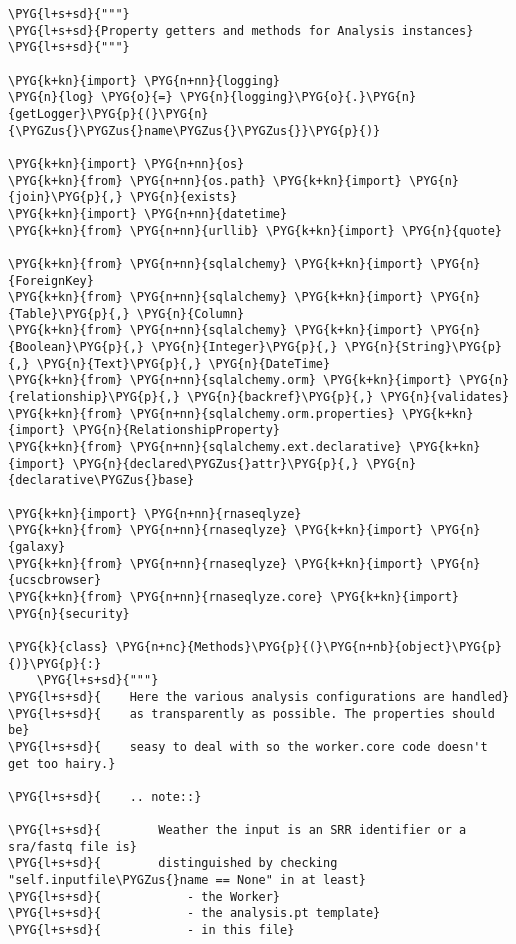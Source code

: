 \begin{Verbatim}[commandchars=\\\{\}]
\PYG{l+s+sd}{"""}
\PYG{l+s+sd}{Property getters and methods for Analysis instances}
\PYG{l+s+sd}{"""}

\PYG{k+kn}{import} \PYG{n+nn}{logging}
\PYG{n}{log} \PYG{o}{=} \PYG{n}{logging}\PYG{o}{.}\PYG{n}{getLogger}\PYG{p}{(}\PYG{n}{\PYGZus{}\PYGZus{}name\PYGZus{}\PYGZus{}}\PYG{p}{)}

\PYG{k+kn}{import} \PYG{n+nn}{os}
\PYG{k+kn}{from} \PYG{n+nn}{os.path} \PYG{k+kn}{import} \PYG{n}{join}\PYG{p}{,} \PYG{n}{exists}
\PYG{k+kn}{import} \PYG{n+nn}{datetime}
\PYG{k+kn}{from} \PYG{n+nn}{urllib} \PYG{k+kn}{import} \PYG{n}{quote}

\PYG{k+kn}{from} \PYG{n+nn}{sqlalchemy} \PYG{k+kn}{import} \PYG{n}{ForeignKey}
\PYG{k+kn}{from} \PYG{n+nn}{sqlalchemy} \PYG{k+kn}{import} \PYG{n}{Table}\PYG{p}{,} \PYG{n}{Column}
\PYG{k+kn}{from} \PYG{n+nn}{sqlalchemy} \PYG{k+kn}{import} \PYG{n}{Boolean}\PYG{p}{,} \PYG{n}{Integer}\PYG{p}{,} \PYG{n}{String}\PYG{p}{,} \PYG{n}{Text}\PYG{p}{,} \PYG{n}{DateTime}
\PYG{k+kn}{from} \PYG{n+nn}{sqlalchemy.orm} \PYG{k+kn}{import} \PYG{n}{relationship}\PYG{p}{,} \PYG{n}{backref}\PYG{p}{,} \PYG{n}{validates}
\PYG{k+kn}{from} \PYG{n+nn}{sqlalchemy.orm.properties} \PYG{k+kn}{import} \PYG{n}{RelationshipProperty}
\PYG{k+kn}{from} \PYG{n+nn}{sqlalchemy.ext.declarative} \PYG{k+kn}{import} \PYG{n}{declared\PYGZus{}attr}\PYG{p}{,} \PYG{n}{declarative\PYGZus{}base}

\PYG{k+kn}{import} \PYG{n+nn}{rnaseqlyze}
\PYG{k+kn}{from} \PYG{n+nn}{rnaseqlyze} \PYG{k+kn}{import} \PYG{n}{galaxy}
\PYG{k+kn}{from} \PYG{n+nn}{rnaseqlyze} \PYG{k+kn}{import} \PYG{n}{ucscbrowser}
\PYG{k+kn}{from} \PYG{n+nn}{rnaseqlyze.core} \PYG{k+kn}{import} \PYG{n}{security}

\PYG{k}{class} \PYG{n+nc}{Methods}\PYG{p}{(}\PYG{n+nb}{object}\PYG{p}{)}\PYG{p}{:}
    \PYG{l+s+sd}{"""}
\PYG{l+s+sd}{    Here the various analysis configurations are handled}
\PYG{l+s+sd}{    as transparently as possible. The properties should be}
\PYG{l+s+sd}{    seasy to deal with so the worker.core code doesn't get too hairy.}

\PYG{l+s+sd}{    .. note::}

\PYG{l+s+sd}{        Weather the input is an SRR identifier or a sra/fastq file is}
\PYG{l+s+sd}{        distinguished by checking "self.inputfile\PYGZus{}name == None" in at least}
\PYG{l+s+sd}{            - the Worker}
\PYG{l+s+sd}{            - the analysis.pt template}
\PYG{l+s+sd}{            - in this file}


\end{Verbatim}
